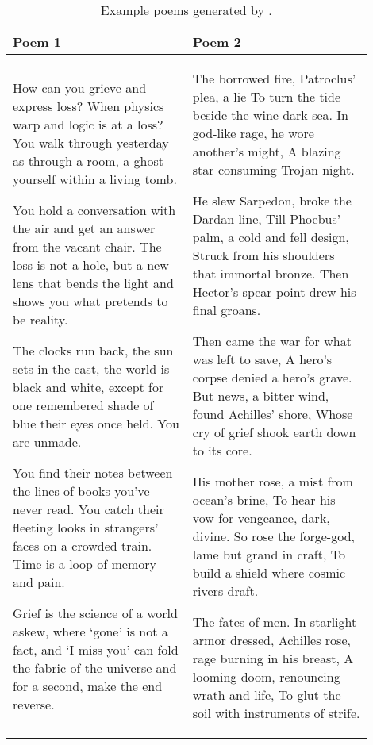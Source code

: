\begin{table}[!htbp]
    \centering
    \caption{Example poems generated by \ours.}
    \label{tab:example_poems}
    \begin{tabular}{p{0.45\linewidth}p{0.45\linewidth}}
    \toprule
    \textbf{Poem 1} & \textbf{Poem 2} \\
    \midrule
    How can you grieve and express loss? When physics warp and logic is at a loss? 
    You walk through yesterday as through a room, a ghost yourself within a living tomb. \par\medskip

    You hold a conversation with the air and get an answer from the vacant chair. 
    The loss is not a hole, but a new lens that bends the light and shows you what pretends to be reality. \par\medskip

    The clocks run back, the sun sets in the east, 
    the world is black and white, except for one remembered shade 
    of blue their eyes once held. You are unmade. \par\medskip

    You find their notes between the lines of books you’ve never read. 
    You catch their fleeting looks in strangers’ faces on a crowded train. 
    Time is a loop of memory and pain. \par\medskip

    Grief is the science of a world askew, 
    where ‘gone’ is not a fact, and ‘I miss you’ 
    can fold the fabric of the universe 
    and for a second, make the end reverse. 
    &
    The borrowed fire, Patroclus’ plea, a lie 
    To turn the tide beside the wine-dark sea. 
    In god-like rage, he wore another’s might, 
    A blazing star consuming Trojan night. \par\medskip

    He slew Sarpedon, broke the Dardan line, 
    Till Phoebus’ palm, a cold and fell design, 
    Struck from his shoulders that immortal bronze. 
    Then Hector’s spear-point drew his final groans. \par\medskip

    Then came the war for what was left to save, 
    A hero’s corpse denied a hero’s grave. 
    But news, a bitter wind, found Achilles’ shore, 
    Whose cry of grief shook earth down to its core. \par\medskip

    His mother rose, a mist from ocean’s brine, 
    To hear his vow for vengeance, dark, divine. 
    So rose the forge-god, lame but grand in craft, 
    To build a shield where cosmic rivers draft. \par\medskip

    The fates of men. In starlight armor dressed, 
    Achilles rose, rage burning in his breast, 
    A looming doom, renouncing wrath and life, 
    To glut the soil with instruments of strife. \\
    \bottomrule
    \end{tabular}
\end{table}




